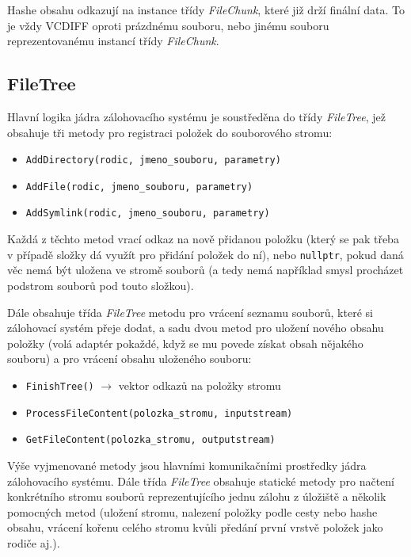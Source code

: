 Hashe obsahu odkazují na instance třídy {\it FileChunk}, které již drží finální
data. To je vždy \gls{VCDIFF} oproti prázdnému souboru, nebo jinému souboru
reprezentovanému instancí třídy {\it FileChunk}.

\subsection{FileTree}

Hlavní logika jádra zálohovacího systému je soustředěna do třídy {\it FileTree},
jež obsahuje tři metody pro registraci položek do souborového stromu:

\begin{itemize}
	\item\texttt{AddDirectory(rodic, jmeno\_souboru, parametry)}
	\item\texttt{AddFile(rodic, jmeno\_souboru, parametry)}
	\item\texttt{AddSymlink(rodic, jmeno\_souboru, parametry)}
\end{itemize}

Každá z těchto metod vrací odkaz na nově přidanou položku (který se pak třeba
v případě složky dá využít pro přidání položek do ní), nebo \texttt{nullptr},
pokud daná věc nemá být uložena ve stromě souborů (a tedy nemá například smysl
procházet podstrom souborů pod touto složkou).

Dále obsahuje třída {\it FileTree} metodu pro vrácení seznamu souborů, které si
zálohovací systém přeje dodat, a sadu dvou metod pro uložení nového obsahu
položky (volá adaptér pokaždé, když se mu povede získat obsah nějakého souboru)
a pro vrácení obsahu uloženého souboru:

\begin{itemize}
	\item\texttt{FinishTree()} $\rightarrow$ vektor odkazů na položky stromu
	\item\texttt{ProcessFileContent(polozka\_stromu, inputstream)}
	\item\texttt{GetFileContent(polozka\_stromu, outputstream)}
\end{itemize}

Výše vyjmenované metody jsou hlavními komunikačními prostředky jádra
zálohovacího systému. Dále třída {\it FileTree} obsahuje statické metody pro
načtení konkrétního stromu souborů reprezentujícího jednu zálohu z úložiště a
několik pomocných metod (uložení stromu, nalezení položky podle cesty nebo hashe
obsahu, vrácení kořenu celého stromu kvůli předání první vrstvě položek jako
rodiče aj.).

